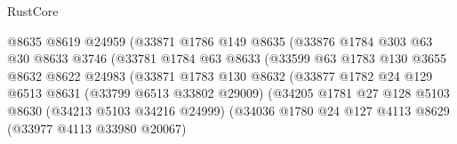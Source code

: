 \begin{lexlean}{RustCore}
\begin{coremodule}
                                    @8635
                                    @8619
                                    @24959
                                    (@33871
                                      @1786
                                      @149
                                      @8635
                                      (@33876
                                        @1784
                                        @303
                                        @63
                                        @30
                                        @8633
                                        @3746
                                        (@33781
                                          @1784
                                          @63
                                          @8633
                                          (@33599
                                            @63
                                            @1783
                                            @130
                                            @3655
                                            @8632
                                            @8622
                                            @24983
                                            (@33871
                                              @1783
                                              @130
                                              @8632
                                              (@33877
                                                @1782
                                                @24
                                                @129
                                                @6513
                                                @8631
                                                (@33799 @6513 @33802 @29009)
                                                (@34205
                                                  @1781
                                                  @27
                                                  @128
                                                  @5103
                                                  @8630
                                                  (@34213 @5103 @34216 @24999)
                                                  (@34036
                                                    @1780
                                                    @24
                                                    @127
                                                    @4113
                                                    @8629
                                                    (@33977 @4113 @33980 @20067)

\end{coremodule}
\end{lexlean}
